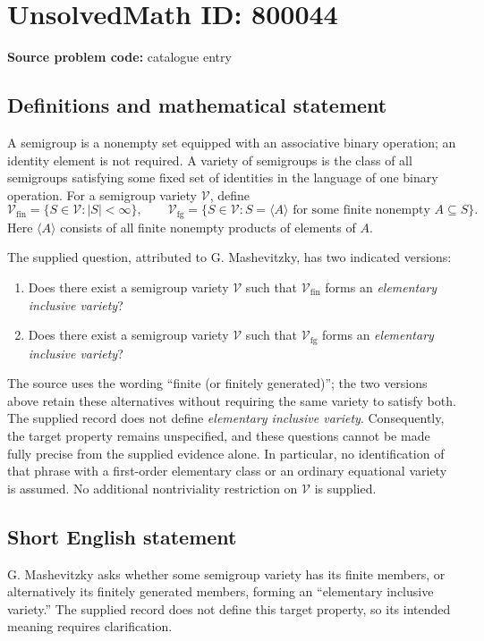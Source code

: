 \documentclass[11pt]{article}
\begin{document}
\section*{UnsolvedMath ID: 800044}
\textbf{Source problem code:} catalogue entry
\subsection{Definitions and mathematical statement}
A semigroup is a nonempty set equipped with an associative binary operation; an identity element is not required. A variety of semigroups is the class of all semigroups satisfying some fixed set of identities in the language of one binary operation. For a semigroup variety \(\mathcal V\), define
\[
\mathcal V_{\mathrm{fin}}=\{S\in\mathcal V: |S|<\infty\},
\qquad
\mathcal V_{\mathrm{fg}}=\{S\in\mathcal V: S=\langle A\rangle\text{ for some finite nonempty }A\subseteq S\}.
\]
Here \(\langle A\rangle\) consists of all finite nonempty products of elements of \(A\).

The supplied question, attributed to G. Mashevitzky, has two indicated versions:
\begin{enumerate}
\item Does there exist a semigroup variety \(\mathcal V\) such that \(\mathcal V_{\mathrm{fin}}\) forms an \emph{elementary inclusive variety}?
\item Does there exist a semigroup variety \(\mathcal V\) such that \(\mathcal V_{\mathrm{fg}}\) forms an \emph{elementary inclusive variety}?
\end{enumerate}
The source uses the wording ``finite (or finitely generated)''; the two versions above retain these alternatives without requiring the same variety to satisfy both. The supplied record does not define \emph{elementary inclusive variety}. Consequently, the target property remains unspecified, and these questions cannot be made fully precise from the supplied evidence alone. In particular, no identification of that phrase with a first-order elementary class or an ordinary equational variety is assumed. No additional nontriviality restriction on \(\mathcal V\) is supplied.
\subsection{Short English statement}
G. Mashevitzky asks whether some semigroup variety has its finite members, or alternatively its finitely generated members, forming an ``elementary inclusive variety.'' The supplied record does not define this target property, so its intended meaning requires clarification.
\end{document}
